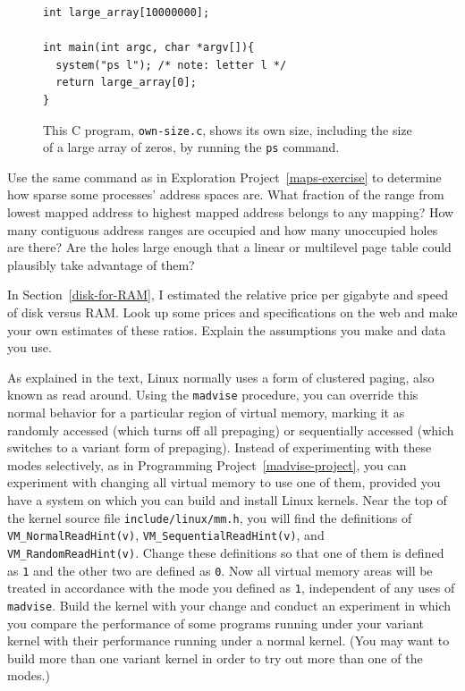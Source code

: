 \begin{chapterEnumerate}
\begin{figure}
\begin{verbatim}
int large_array[10000000];

int main(int argc, char *argv[]){
  system("ps l"); /* note: letter l */
  return large_array[0];
}
\end{verbatim}
\caption{This C program, {\tt own-size.c}, shows its own size, including the size of a
  large array of zeros, by running the {\tt ps} command.}
\label{own-size-program}
\end{figure}
\item
Use the same command as in Exploration Project~\ref{maps-exercise} to determine
how sparse some processes' address spaces are.  What fraction of the
range from lowest mapped address to highest mapped address belongs to
any mapping?  How many contiguous address ranges are occupied and how
many unoccupied holes are there?  Are the holes large enough that a
linear or multilevel page table could plausibly take advantage of
them?
\item
In Section~\ref{disk-for-RAM}, I estimated the relative price per
gigabyte and speed of disk versus RAM.  Look up some prices and
specifications on the web and make your own estimates of these
ratios.  Explain the assumptions you make and data you use.
\item
As explained in the text, Linux normally uses a form of clustered
paging, also known as read around.  Using the
\verb|madvise|
procedure, you can override this normal behavior for a particular region of
virtual memory, marking it as randomly accessed (which turns off all
prepaging) or sequentially accessed (which switches to a variant form
of prepaging).  Instead of experimenting with these modes selectively,
as in Programming Project~\ref{madvise-project}, you can experiment
with changing all virtual memory to use one of them, provided you have a system on which you can build and
install Linux kernels.  Near the top of the kernel source file
\verb|include/linux/mm.h|, you will find the definitions of
\verb|VM_NormalReadHint(v)|, \verb|VM_SequentialReadHint(v)|, and
\verb|VM_RandomReadHint(v)|.  Change these definitions so that one of
them is defined as \verb|1| and the other two are defined as
\verb|0|.  Now all virtual memory areas will be treated in accordance
with the mode you defined as \verb|1|, independent of any uses of
\verb|madvise|.  Build the kernel with your change and conduct an
experiment in which you compare the performance of some
programs running under your variant kernel with their performance
running under a normal kernel.  (You may want to build more than one
variant kernel in order to try out more than one of the modes.)

\end{chapterEnumerate}
